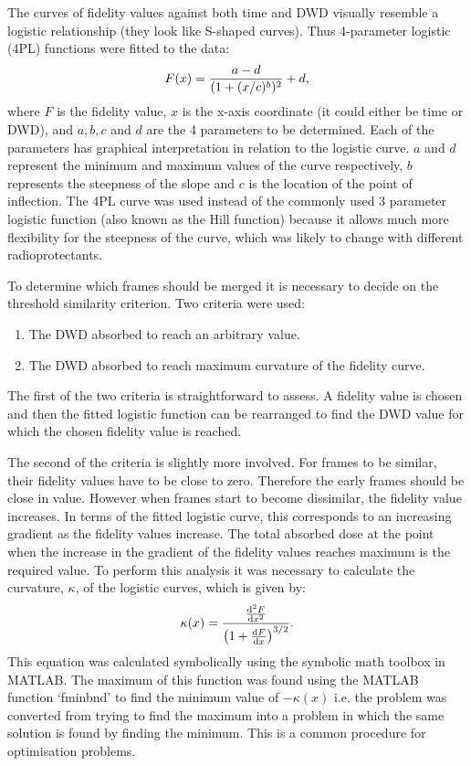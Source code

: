 The curves of fidelity values against both time and DWD visually resemble a logistic relationship (they look like S-shaped curves).
Thus 4-parameter logistic (4PL) functions were fitted to the data:
\begin{equation}
    F(x) = \frac{a - d}{(1 + (x/c)^b)^2} + d,
    \label{eq:4PL}
\end{equation}
where $F$ is the fidelity value, $x$ is the x-axis coordinate (it could either be time or DWD), and $a, b, c$ and $d$ are the 4 parameters to be determined.
Each of the parameters has graphical interpretation in relation to the logistic curve.
$a$ and $d$ represent the minimum and maximum values of the curve respectively, $b$ represents the steepness of the slope and $c$ is the location of the point of inflection.
The 4PL curve was used instead of the commonly used 3 parameter logistic function (also known as the Hill function) because it allows much more flexibility for the steepness of the curve, which was likely to change with different radioprotectants.

To determine which frames should be merged it is necessary to decide on the threshold similarity criterion.
Two criteria were used:
\begin{enumerate}
    \item The DWD absorbed to reach an arbitrary value.
    \item The DWD absorbed to reach maximum curvature of the fidelity curve.
\end{enumerate}
The first of the two criteria is straightforward to assess.
A fidelity value is chosen and then the fitted logistic function can be rearranged to find the DWD value for which the chosen fidelity value is reached.

The second of the criteria is slightly more involved. For frames to be similar, their fidelity values have to be close to zero.
Therefore the early frames should be close in value.
However when frames start to become dissimilar, the fidelity value increases.
In terms of the fitted logistic curve, this corresponds to an increasing gradient as the fidelity values increase.
The total absorbed dose at the point when the increase in the gradient of the fidelity values reaches maximum is the required value.
To perform this analysis it was necessary to calculate the curvature, $\kappa$, of the logistic curves, which is  given by:
\begin{equation}
    \kappa(x) = \frac{\frac{\mathrm{d}^2F}{\mathrm{d}x^2}}{\left( 1 + \frac{\mathrm{d}F}{\mathrm{d}x}\right)^{3/2}}.
    \label{eq:Curvature}
\end{equation}
This equation was calculated symbolically using the symbolic math toolbox in MATLAB. The maximum of this function was found using the MATLAB function `fminbnd' to find the minimum value of $-\kappa(x)$ i.e. the problem was converted from trying to find the maximum into a problem in which the same solution is found by finding the minimum. This is a common procedure for optimisation problems.

